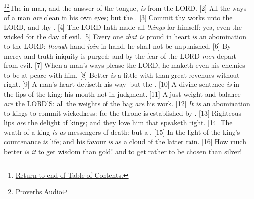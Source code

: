 \footnote{\textcolor[cmyk]{0.99998,1,0,0}{\hyperlink{TOC}{Return to end of Table of Contents.}}}\footnote{\href{https://audiobible.com/bible/proverbs_16.html}{\textcolor[cmyk]{0.99998,1,0,0}{Proverbs Audio}}}\textcolor[cmyk]{0.99998,1,0,0}{The  in man, and the answer of the tongue, \emph{is} from the LORD.}
[2] \textcolor[cmyk]{0.99998,1,0,0}{All the ways of a man \emph{are} clean in his own eyes; but the    .}
[3] \textcolor[cmyk]{0.99998,1,0,0}{Commit thy works unto the LORD, and thy  .}
[4] \textcolor[cmyk]{0.99998,1,0,0}{The LORD hath made all \emph{things} for himself: yea, even the wicked for the day of evil.}
[5] \textcolor[cmyk]{0.99998,1,0,0}{Every one \emph{that} \emph{is} proud in heart \emph{is} an abomination to the LORD: \emph{though} hand \emph{join} in hand, he shall not be unpunished.}
[6] \textcolor[cmyk]{0.99998,1,0,0}{By mercy and truth iniquity is purged: and by the fear of the LORD \emph{men} depart from evil.}
[7] \textcolor[cmyk]{0.99998,1,0,0}{When a man's ways please the LORD, he maketh even his enemies to be at peace with him.}
[8] \textcolor[cmyk]{0.99998,1,0,0}{Better \emph{is} a little with  than great revenues without right.}
[9] \textcolor[cmyk]{0.99998,1,0,0}{A man's heart deviseth his way: but the .}
[10] \textcolor[cmyk]{0.99998,1,0,0}{A divine sentence \emph{is} in the lips of the king: his mouth  not in judgment.}
[11] \textcolor[cmyk]{0.99998,1,0,0}{A just weight and balance \emph{are} the LORD'S: all the weights of the bag \emph{are} his work.}
[12] \textcolor[cmyk]{0.99998,1,0,0}{\emph{It} \emph{is} an abomination to kings to commit wickedness: for the throne is established by .}
[13] \textcolor[cmyk]{0.99998,1,0,0}{Righteous lips \emph{are} the delight of kings; and they love him that speaketh right.}
[14] \textcolor[cmyk]{0.99998,1,0,0}{The wrath of a king \emph{is} \emph{as} messengers of death: but a .}
[15] \textcolor[cmyk]{0.99998,1,0,0}{In the light of the king's countenance \emph{is} life; and his favour \emph{is} as a cloud of the latter rain.}
[16] \textcolor[cmyk]{0.99998,1,0,0}{How much better \emph{is} \emph{it} to get wisdom than gold! and to get  rather to be chosen than silver!}
